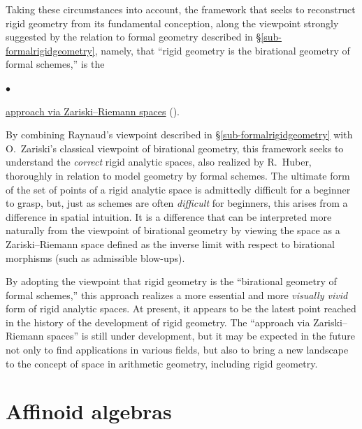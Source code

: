 \documentclass[a4paper,12pt, dvipdfmx]{jsbook}
\renewenvironment{itemize}%
{%
   \begin{list}{\parbox{1zw}{$\bullet$}}%
   {%
      \setlength{\topsep}{.5zh}
      \setlength{\itemindent}{0zw}
      \setlength{\leftmargin}{3zw}%
      \setlength{\rightmargin}{0zw}%
      \setlength{\labelsep}{.5zw}%
      \setlength{\labelwidth}{3zw}%
      \setlength{\itemsep}{0.2em}%
      \setlength{\parsep}{0em}%
      \setlength{\listparindent}{0zw}%
   }
}{%
   \end{list}%
}
\theoremstyle{plain}
\theoremstyle{definition}
\newcounter{chushaku}
\begin{document}
Taking these circumstances into account, the framework that seeks to reconstruct rigid geometry from its fundamental conception, along the viewpoint strongly suggested by the relation to formal geometry described in \S\ref{sub-formalrigidgeometry}, namely, that ``rigid geometry is the birational geometry of formal schemes,'' is the
\begin{itemize}
\item \underline{approach via Zariski--Riemann spaces} (\cite{FK0}\cite{FK}).
\end{itemize}
By combining Raynaud's viewpoint described in \S\ref{sub-formalrigidgeometry} with O.\ Zariski's classical viewpoint of birational geometry, this framework seeks to understand the {\it correct} rigid analytic spaces, also realized by R.\ Huber, thoroughly in relation to model geometry by formal schemes.
The ultimate form of the set of points of a rigid analytic space is admittedly difficult for a beginner to grasp, but, just as schemes are often {\it difficult} for beginners, this arises from a difference in spatial intuition.
It is a difference that can be interpreted more naturally from the viewpoint of birational geometry by viewing the space as a Zariski--Riemann space defined as the inverse limit with respect to birational morphisms (such as admissible blow-ups).

By adopting the viewpoint that rigid geometry is the ``birational geometry of formal schemes,'' this approach realizes a more essential and more {\it visually vivid} form of rigid analytic spaces. At present, it appears to be the latest point reached in the history of the development of rigid geometry.
The ``approach via Zariski--Riemann spaces'' is still under development, but it may be expected in the future not only to find applications in various fields, but also to bring a new landscape to the concept of space in arithmetic geometry, including rigid geometry.





\setcounter{chushaku}{0}
\chapter{Affinoid algebras}\label{CH-AFFINOIDALGEBRAS}
\end{document}
